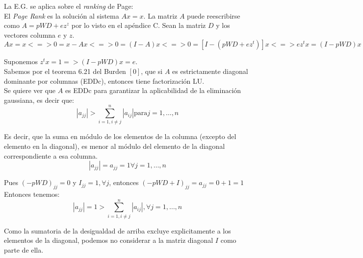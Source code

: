 		La E.G. se aplica sobre el \textit{ranking} de Page: \\

		El \textit{Page Rank} es la solución al sistema $Ax=x$. La matriz $A$ puede reescribirse como $A=pWD+ez^{z}$ por lo visto en el apéndice C. Sean la matriz $D$ y los vectores columna $e$ y $z$. \\

		\begin{equation}
			Ax=x <=> 0 = x-Ax <=> 0 = (I-A)x <=> 0 = [I - (pWD+ez^{t})]x <=> ez^{t}x = (I-pWD)x
		\end{equation}

		Suponemos $z^{t}x = 1 => (I-pWD)x = e$. \\

		Sabemos por el teorema 6.21 del Burden $[0]$, que si $A$ es estrictamente diagonal dominante por columnas (EDDc), entonces tiene factorización LU. \\ %

		Se quiere ver que $A$ es EDDc para garantizar la aplicabilidad de la eliminación gaussiana, es decir que: \\

		\begin{equation}
			|a_{jj}| > \sum^{n}_{i=1, i \neq j} |a_{ij}| \text{para} j = 1, \hdots, n
		\end{equation}

		Es decir, que la suma en módulo de los elementos de la columna (excepto del elemento en la diagonal), es menor al módulo del elemento de la diagonal correspondiente a esa columna. \\

		\begin{equation}
			|a_{jj}| = a_{jj} = 1 \forall j = 1, \hdots, n
		\end{equation}

		Pues $(-pWD)_{jj} = 0$ y $I_{jj} = 1, \forall j$, entonces $(-pWD + I)_{jj} = a_{jj} = 0 + 1 = 1$ \\

		Entonces tenemos: \\

		\begin{equation}
			|a_{jj}| = 1 > \sum_{i=1, i \neq j}^{n} |a_{ij}|, \forall j = 1, \hdots, n
		\end{equation}

		Como la sumatoria de la desigualdad de arriba excluye explicitamente a los elementos de la diagonal, podemos no considerar a la matriz diagonal $I$ como parte de ella. \\

